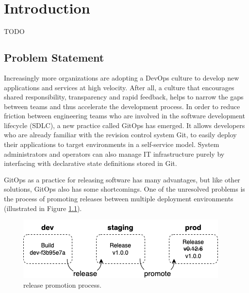 
\chapter{Introduction}

TODO

\section{Problem Statement}


Increasingly more organizations are adopting 
a DevOps culture to develop new applications and services at high velocity. 
After all, a culture that encourages shared responsibility, transparency and rapid feedback, 
helps to narrow the gaps between teams and thus accelerate the development process.
In order to
reduce friction between engineering teams who are involved in the software development lifecycle (SDLC),
a new practice called GitOps has emerged.
It allows developers who are already familiar with the revision control system Git,
to easily deploy their applications to target environments in a self-service model.
System administrators and operators can also manage IT infrastructure
purely by interfacing with declarative state definitions stored in Git.
\bigskip



\noindent
GitOps as a practice for releasing software has many advantages,
but like other solutions, GitOps also has some shortcomings.
One of the unresolved problems is
the process of promoting releases between multiple deployment environments (illustrated in Figure \ref{fig:releasePromotionProcess}).

\begin{figure}[h]
	\centering
	\includegraphics[width=.55\linewidth]{figures/release-promotion.drawio.png}
	\caption{release promotion process.
	}
	\label{fig:releasePromotionProcess}	
\end{figure}

